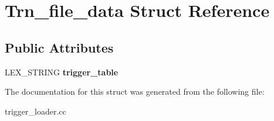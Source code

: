\hypertarget{structTrn__file__data}{}\section{Trn\+\_\+file\+\_\+data Struct Reference}
\label{structTrn__file__data}
\subsection*{Public Attributes}
\begin{DoxyCompactItemize}
\item 
\mbox{\label{structTrn__file__data_a5b1155f012c1ac7e14b8a30ebc3b0db9}} 
L\+E\+X\+\_\+\+S\+T\+R\+I\+NG {\bfseries trigger\+\_\+table}
\end{DoxyCompactItemize}


The documentation for this struct was generated from the following file\+:\begin{DoxyCompactItemize}
\item 
trigger\+\_\+loader.\+cc\end{DoxyCompactItemize}
